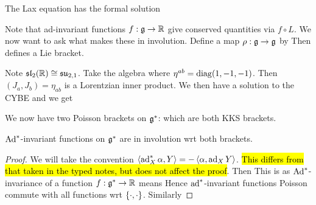 \documentclass{article}
\begin{document}
\begin{prop}
The Lax equation has the formal solution 
\end{prop}

Note that ad-invariant functions $f: \mf{g} \to \mbb{R}$ give conserved quantities via $f \circ L$. We now want to ask what makes these in involution. Define a map $\rho : \mf{g} \to \mf{g}$ by 
Then 
defines a Lie bracket. 

\begin{ex}
Note $\mf{sl}_2(\mbb{R}) \cong \mf{su}_{2,1}$. Take the algebra 
where $\eta^{ab} = \diag(1,-1,-1)$. Then $(J_a,J_b) = \eta_{ab}$ is a Lorentzian inner product. We then have a solution to the CYBE 
and we get 
\end{ex}

We now have two Poisson brackets on $\mf{g}^\ast$: 
which are both KKS brackets. 

\begin{prop}
$\Ad^\ast$-invariant functions on $\mf{g}^\ast$ are in involution wrt both brackets. 
\end{prop}
\begin{proof}
We will take the convention $\pangle{\ad_X^\ast \alpha,Y} = -\pangle{\alpha,\ad_X Y}$. \hl{This differs from that taken in the typed notes, but does not affect the proof}. Then 
This is as $\Ad^\ast$-invariance of a function $f:\mf{g}^\ast \to \mbb{R}$ means 
Hence $\ad^\ast$-invariant functions Poisson commute with all functions wrt $\acomm[\cdot]{\cdot}$. Similarly 
\end{proof}
\end{document}
